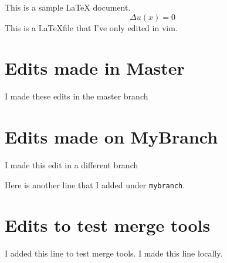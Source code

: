 \documentclass[11pt,letterpaper]{article}
\begin{document}
	This is a sample LaTeX document.
	\begin{equation} \Delta u(x)=0\end{equation}
	This is a \LaTeX file that I've only edited in vim.	
	
	\section{Edits made in Master}
	I made these edits in the master branch

	\section{Edits made on MyBranch}
	I made this edit in a different branch

	Here is another line that I added under \verb|mybranch|. 

	\section{Edits to test merge tools}
	I added this line to test merge tools. I made this line locally. 
\end{document}
